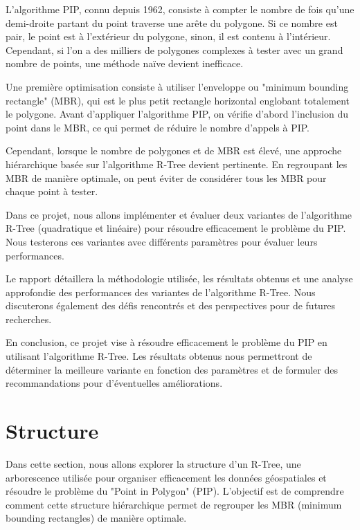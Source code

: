 \documentclass {article}
\begin{document}
L'algorithme PIP, connu depuis 1962, consiste à compter le nombre de fois qu'une demi-droite partant du point
traverse une arête du polygone. Si ce nombre est pair, le point est à l'extérieur du polygone, sinon,
il est contenu à l'intérieur. Cependant, si l'on a des milliers de polygones complexes à tester avec un
grand nombre de points, une méthode naïve devient inefficace.

Une première optimisation consiste à utiliser l'enveloppe ou "minimum bounding rectangle" (MBR),
qui est le plus petit rectangle horizontal englobant totalement le polygone. Avant d'appliquer l'algorithme PIP,
on vérifie d'abord l'inclusion du point dans le MBR, ce qui permet de réduire le nombre d'appels à PIP.

Cependant, lorsque le nombre de polygones et de MBR est élevé, une approche hiérarchique basée sur l'algorithme R-Tree
devient pertinente. En regroupant les MBR de manière optimale, on peut éviter de considérer tous les MBR pour
chaque point à tester.

Dans ce projet, nous allons implémenter et évaluer deux variantes de l'algorithme R-Tree (quadratique et linéaire)
pour résoudre efficacement le problème du PIP. Nous testerons ces variantes avec différents paramètres pour
évaluer leurs performances.

Le rapport détaillera la méthodologie utilisée, les résultats obtenus et une analyse approfondie des performances
des variantes de l'algorithme R-Tree. Nous discuterons également des défis rencontrés et des perspectives pour de
futures recherches.


En conclusion, ce projet vise à résoudre efficacement le problème du PIP en utilisant l'algorithme
R-Tree.
Les résultats obtenus nous permettront de déterminer la meilleure variante en fonction des
paramètres et de formuler des recommandations pour d'éventuelles améliorations.

\section {Structure}

Dans cette section, nous allons explorer la structure d'un R-Tree, une arborescence utilisée
pour organiser efficacement les données géospatiales et résoudre le problème du
"Point in Polygon" (PIP). L'objectif est de comprendre comment cette structure hiérarchique
permet de regrouper les MBR (minimum bounding rectangles) de manière optimale.
\end{document}
